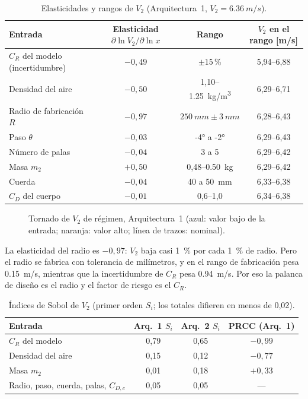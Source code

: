 \begin{table}[H]
\centering\small
\caption{Elasticidades y rangos de $V_2$ (Arquitectura~1, $V_2=\SI{6.36}{m/s}$).}\label{tab:sens-elast}
\begin{tabular}{@{}lccc@{}}
\toprule
\textbf{Entrada} & \textbf{Elasticidad} $\partial\ln V_2/\partial\ln x$ & \textbf{Rango} & \textbf{$V_2$ en el rango} [m/s]\\\midrule
$C_R$ del modelo (incertidumbre) & $-0{,}49$ & $\pm15$\,\% & 5,94--6,88\\
Densidad del aire & $-0{,}50$ & 1,10--\SI{1.25}{kg/m^3} & 6,29--6,71\\
Radio de fabricación $R$ & $-0{,}97$ & $\SI{250}{mm}\pm\SI{3}{mm}$ & 6,28--6,43\\
Paso $\theta$ & $-0{,}03$ & \ang{-4} a \ang{-2} & 6,29--6,43\\
Número de palas & $-0{,}04$ & 3 a 5 & 6,29--6,42\\
Masa $m_2$ & $+0{,}50$ & 0,48--\SI{0.50}{kg} & 6,29--6,42\\
Cuerda & $-0{,}04$ & 40 a \SI{50}{mm} & 6,33--6,38\\
$C_D$ del cuerpo & $-0{,}01$ & 0,6--1,0 & 6,34--6,38\\
\bottomrule
\end{tabular}
\end{table}

\begin{figure}[H]
\centering

\caption{Tornado de $V_2$ de régimen, Arquitectura~1 (azul: valor bajo de la entrada;
naranja: valor alto; línea de trazos: nominal).}
\label{fig:sens-tornado-V2}
\end{figure}

La elasticidad del radio es $-0{,}97$: $V_2$ baja casi \SI{1}{\percent} por cada \SI{1}{\percent} de
radio. Pero el radio se fabrica con tolerancia de milímetros, y en el rango de fabricación
pesa \SI{0.15}{m/s}, mientras que la incertidumbre de $C_R$ pesa \SI{0.94}{m/s}. Por eso la
palanca de diseño es el radio y el factor de riesgo es el $C_R$.

\begin{table}[H]
\centering\small
\caption{Índices de Sobol de $V_2$ (primer orden $S_i$; los totales difieren en menos de 0,02).}\label{tab:sens-sobol-V2}
\begin{tabular}{@{}lccc@{}}
\toprule
\textbf{Entrada} & \textbf{Arq.~1} $S_i$ & \textbf{Arq.~2} $S_i$ & PRCC (Arq.~1)\\\midrule
$C_R$ del modelo & 0,79 & 0,65 & $-0{,}99$\\
Densidad del aire & 0,15 & 0,12 & $-0{,}77$\\
Masa $m_2$ & 0,01 & 0,18 & $+0{,}33$\\
Radio, paso, cuerda, palas, $C_{D,c}$ & 0,05 & 0,05 & ---\\
\bottomrule
\end{tabular}
\end{table}


